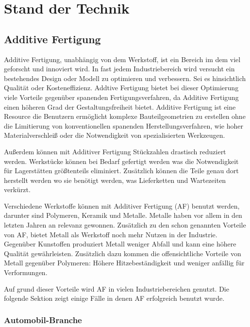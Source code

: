 \documentclass[../main.tex]{subfiles}
\begin{document}
\section{Stand der Technik}

\subsection{Additive Fertigung}

Additive Fertigung, unabhängig von dem Werkstoff, ist ein Bereich im dem viel
geforscht und innoviert wird. In fast jedem Industriebereich wird versucht ein
bestehendes Design oder Modell zu optimieren und verbessern. \cite{newMethod}
Sei es hinsichtlich Qualität oder Kosteneffizienz. Addtive Fertigung bietet bei 
dieser Optimierung viele Vorteile gegenüber spanenden Fertigungsverfahren, da 
Additive Fertigung einen höheren Grad der Gestaltungsfreiheit bietet. 
Additive Fertigung ist eine Resource die Benutzern ermöglicht komplexe 
Bauteilgeometrien zu erstellen ohne die Limitierung von konventionellen spanenden 
Herstellungsverfahren, wie hoher Materialverschleiß oder die Notwendigkeit von 
spezialisierten Werkzeugen. \cite{Vafadar.2021} 

Außerdem können mit Additiver Fertigung Stückzahlen drastisch reduziert werden.
Werkstücke können bei Bedarf gefertigt werden was die Notwendigkeit für Lagerstätten
größtenteils eliminiert. Zusätzlich können die Teile genau dort herstellt werden wo 
sie benötigt werden, was Lieferketten und Wartezeiten verkürzt.

Verschiedene Werkstoffe können mit Additiver Fertigung (AF) benutzt werden, darunter
sind Polymeren, Keramik und Metalle. Metalle haben vor allem in den letzten Jahren 
an relevanz gewonnen. Zusätzlich zu den schon genannten Vorteile von AF, 
bietet Metall als Werkstoff noch mehr Nutzen in der Industrie. Gegenüber Kunstoffen
produziert Metall weniger Abfall und kann eine höhere Qualität gewährleisten.
Zusätzlich dazu kommen die offensichtliche Vorteile von Metall gegenüber Polymeren: 
Höhere Hitzebeständigkeit und weniger anfällig für Verformungen.

Auf grund dieser Vorteile wird AF in vielen Industriebereichen genutzt. Die folgende
Sektion zeigt einige Fälle in denen AF erfolgreich benutzt wurde.

\subsubsection*{Automobil-Branche}
\end{document}
